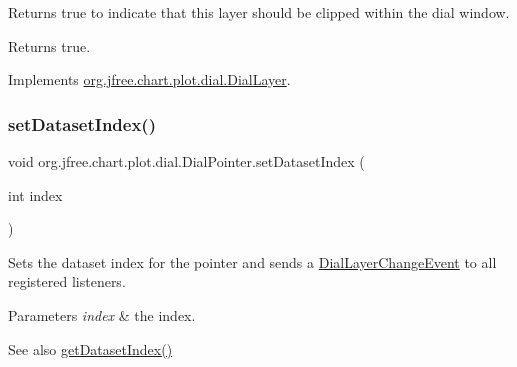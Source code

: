 Returns {\ttfamily true} to indicate that this layer should be clipped within the dial window.

\begin{DoxyReturn}{Returns}
{\ttfamily true}. 
\end{DoxyReturn}


Implements \mbox{\hyperlink{interfaceorg_1_1jfree_1_1chart_1_1plot_1_1dial_1_1_dial_layer_a822eeadbe31b48827497714abeda2190}{org.\+jfree.\+chart.\+plot.\+dial.\+Dial\+Layer}}.

\mbox{\label{classorg_1_1jfree_1_1chart_1_1plot_1_1dial_1_1_dial_pointer_af86ef163bf93febe4b323f170ee95a78}} 
\subsubsection{\texorpdfstring{set\+Dataset\+Index()}{setDatasetIndex()}}
{\footnotesize\ttfamily void org.\+jfree.\+chart.\+plot.\+dial.\+Dial\+Pointer.\+set\+Dataset\+Index (\begin{DoxyParamCaption}\item[{int}]{index }\end{DoxyParamCaption})}

Sets the dataset index for the pointer and sends a \mbox{\hyperlink{classorg_1_1jfree_1_1chart_1_1plot_1_1dial_1_1_dial_layer_change_event}{Dial\+Layer\+Change\+Event}} to all registered listeners.


\begin{DoxyParams}{Parameters}
{\em index} & the index.\\
\hline
\end{DoxyParams}
\begin{DoxySeeAlso}{See also}
\mbox{\hyperlink{classorg_1_1jfree_1_1chart_1_1plot_1_1dial_1_1_dial_pointer_afe96b67f23eb74c9230b3bfd04c5eac8}{get\+Dataset\+Index()}} 
\end{DoxySeeAlso}
\mbox{\label{classorg_1_1jfree_1_1chart_1_1plot_1_1dial_1_1_dial_pointer_af2f54d1338e0a0c25ba5ba2c32d0452c}} 
